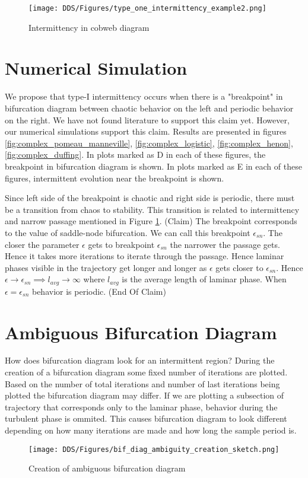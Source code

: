 \begin{figure}[!h]
    \centering
    \texttt{[image: DDS/Figures/type\_one\_intermittency\_example2.png]}
    \caption{Intermittency in cobweb diagram}
    \label{fig:intermittent_cobweb_example}
\end{figure}

\section{Numerical Simulation}
We propose that type-I intermittency occurs when there is a "breakpoint" in bifurcation diagram between chaotic behavior on the left and periodic behavior on the right.
We have not found literature to support this claim yet.
However, our numerical simulations support this claim.
Results are presented in figures \ref{fig:complex_pomeau_manneville}, \ref{fig:complex_logistic}, \ref{fig:complex_henon}, \ref{fig:complex_duffing}.
In plots marked as D in each of these figures, the breakpoint in bifurcation diagram is shown.
In plots marked as E in each of these figures, intermittent evolution near the breakpoint is shown.
\par
Since left side of the breakpoint is chaotic and right side is periodic, there must be a transition from chaos to stability.
This transition is related to intermittency and narrow passage mentioned in Figure \ref{fig:intermittent_cobweb_example}.
(Claim) The breakpoint corresponds to the value of saddle-node bifurcation.
We can call this breakpoint $\epsilon_{sn}$.
The closer the parameter $\epsilon$ gets to breakpoint $\epsilon_{sn}$ the narrower the passage gets.
Hence it takes more iterations to iterate through the passage.
Hence laminar phases visible in the trajectory get longer and longer as $\epsilon$ gets closer to $\epsilon_{sn}$.
Hence $\epsilon \rightarrow \epsilon_{sn} \implies l_{avg} \rightarrow \infty$ where $l_{avg}$ is the average length of laminar phase.
When $\epsilon = \epsilon_{sn}$ behavior is periodic.
(End Of Claim)

\section{Ambiguous Bifurcation Diagram}
How does bifurcation diagram look for an intermittent region?
During the creation of a bifurcation diagram some fixed number of iterations are plotted.
Based on the number of total iterations and number of last iterations being plotted the bifurcation diagram may differ.
If we are plotting a subsection of trajectory that corresponds only to the laminar phase, behavior during the turbulent phase is ommited.
This causes bifurcation diagram to look different depending on how many iterations are made and how long the sample period is.
\par
\begin{figure}[!h]
    \centering
    \texttt{[image: DDS/Figures/bif\_diag\_ambiguity\_creation\_sketch.png]}
    \caption{Creation of ambiguous bifurcation diagram}
    \label{fig:ambiguous_bif_diag}
\end{figure}

